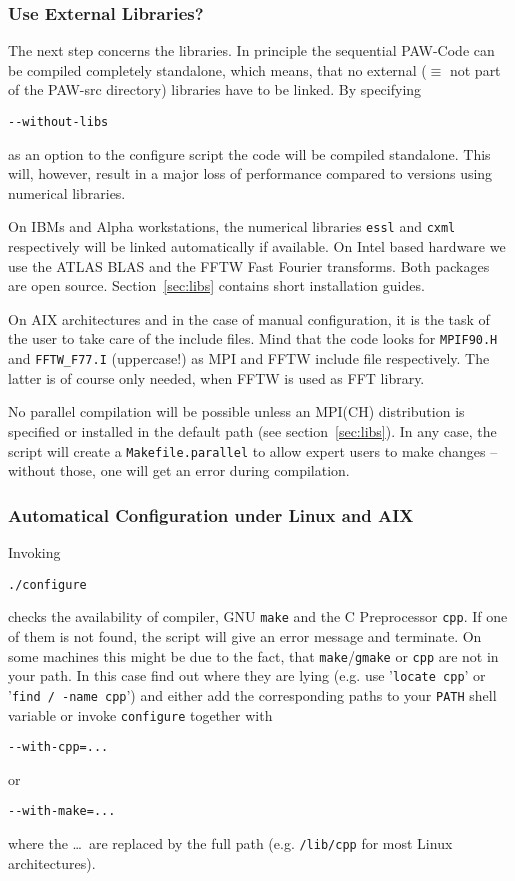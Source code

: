 \documentclass[a4paper,10pt]{article}
\newcommand{\PAW}{\textsc{PAW}}
\begin{document}
\subsubsection*{Use External Libraries?}
\label{sub:libs}
The next step concerns the libraries.  In principle the sequential \PAW-Code can be
compiled completely standalone, which means, that no external ($\equiv$ not
part of the \PAW-src directory) libraries have to be linked.  By specifying
\begin{verbatim}
--without-libs
\end{verbatim}
as an option to the configure script the code will be compiled standalone.
This will, however, result in a major loss of performance compared to versions
using numerical libraries.

On IBMs and Alpha workstations, the numerical libraries \texttt{essl} and
\texttt{cxml} respectively will be linked automatically if available.  On Intel
based hardware we use the \mbox{ATLAS} \mbox{BLAS} and the \mbox{FFTW} Fast Fourier
transforms. Both packages are open source.  Section~\ref{sec:libs} contains
short installation guides.

On AIX architectures and in the case of manual configuration, it is the task of the user to take
care of the include files.  Mind that the code looks for \texttt{MPIF90.H} and
\texttt{FFTW\_F77.I} (uppercase!) as MPI and FFTW include file respectively.  The latter is
of course only needed, when FFTW is used as FFT library.

No parallel compilation will be possible unless an MPI(CH) distribution is
specified or installed in the default path (see section~\ref{sec:libs}).  In
any case, the script will create a \texttt{Makefile.parallel} to allow expert
users to make changes -- without those, one will get an error during
compilation.


\subsubsection*{Automatical Configuration under Linux and AIX}
\label{sub:auto}
Invoking
\begin{verbatim}
./configure
\end{verbatim}
checks the availability of compiler, GNU \texttt{make} and the C Preprocessor \texttt{cpp}.  If one
of them is not found, the script will give an error message and terminate.  On
some machines this might be due to the fact, that \texttt{make}/\texttt{gmake} or \texttt{cpp} are not in
your path.  In this case find out where they are lying (e.g. use '\texttt{locate cpp}' or '\texttt{find / -name cpp}') and either add the
corresponding paths to your \texttt{PATH} shell variable or invoke \texttt{configure} together with
\begin{verbatim}
--with-cpp=...
\end{verbatim}
or
\begin{verbatim}
--with-make=...
\end{verbatim}
where the \ldots\ are replaced by the full path (e.g. \texttt{/lib/cpp} for most Linux architectures).  
\end{document}
